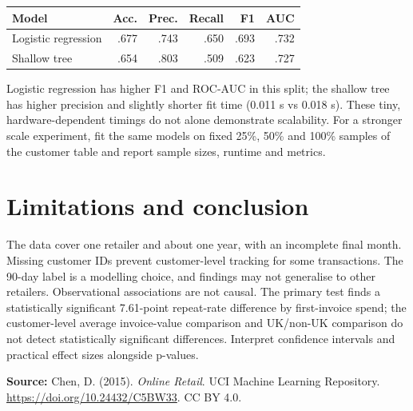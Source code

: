 \documentclass[10pt,a4paper,twocolumn]{article}
\begin{document}
\begin{center}\small
\begin{tabular}{lrrrrr}
\toprule
Model & Acc. & Prec. & Recall & F1 & AUC\\
\midrule
Logistic regression & .677 & .743 & .650 & .693 & .732\\
Shallow tree & .654 & .803 & .509 & .623 & .727\\
\bottomrule
\end{tabular}
\end{center}
Logistic regression has higher F1 and ROC-AUC in this split; the shallow tree has higher precision and slightly shorter fit time (0.011 s vs 0.018 s). These tiny, hardware-dependent timings do not alone demonstrate scalability. For a stronger scale experiment, fit the same models on fixed 25\%, 50\% and 100\% samples of the customer table and report sample sizes, runtime and metrics.

\section{Limitations and conclusion}
The data cover one retailer and about one year, with an incomplete final month. Missing customer IDs prevent customer-level tracking for some transactions. The 90-day label is a modelling choice, and findings may not generalise to other retailers. Observational associations are not causal. The primary test finds a statistically significant 7.61-point repeat-rate difference by first-invoice spend; the customer-level average invoice-value comparison and UK/non-UK comparison do not detect statistically significant differences. Interpret confidence intervals and practical effect sizes alongside p-values.

\textbf{Source:} Chen, D. (2015). \textit{Online Retail}. UCI Machine Learning Repository. \url{https://doi.org/10.24432/C5BW33}. CC BY 4.0.
\end{document}
